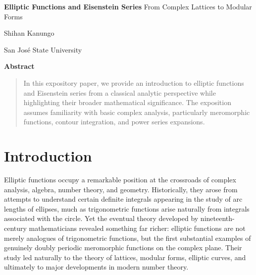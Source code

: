 \documentclass[12pt,reqno]{amsart}
\theoremstyle{plain}
\numberwithin{equation}{section}
\begin{document}
\newpage
\thispagestyle{empty}

\newpage 
\setlength{\parskip}{5pt}
\thispagestyle{empty}
\setcounter{page}{1}

\begin{center}
    {\LARGE \bf Elliptic Functions and Eisenstein Series} 
    \vskip 5pt
    {\normalsize From Complex Lattices to Modular Forms}
    
    \vspace{0.3in}
    {\large  Shihan Kanungo} 
    
    \vspace{0.05in}
    {\small San Jos\'e State University}
\end{center}
\date{\today}

\vspace{0.2in}
\begin{center}
    {\bf Abstract}
\end{center}
\begin{quote}
    {\footnotesize In this expository paper, we provide an introduction to elliptic functions and Eisenstein series from a classical analytic perspective while highlighting their broader mathematical significance. The exposition assumes familiarity with basic complex analysis, particularly meromorphic functions, contour integration, and power series expansions.}
\end{quote} 

\setcounter{section}{0}

\vspace{5mm}
\section{Introduction}

Elliptic functions occupy a remarkable position at the crossroads of complex analysis, algebra, number theory, and geometry. Historically, they arose from attempts to understand certain definite integrals appearing in the study of arc lengths of ellipses, much as trigonometric functions arise naturally from integrals associated with the circle. Yet the eventual theory developed by nineteenth-century mathematicians revealed something far richer: elliptic functions are not merely analogues of trigonometric functions, but the first substantial examples of genuinely doubly periodic meromorphic functions on the complex plane. Their study led naturally to the theory of lattices, modular forms, elliptic curves, and ultimately to major developments in modern number theory.
\end{document}
